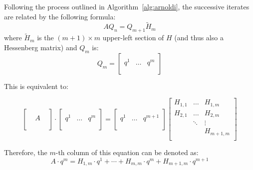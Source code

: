 \noindent Following the process outlined in Algorithm~\hyperref[alg:arnoldi]{\ref{alg:arnoldi}}, the successive iterates are related by the following formula:
\begin{equation}
\label{eqn:arnoldi}
AQ_n=Q_{m+1}\tilde{H}_m
\end{equation}
\noindent where $\tilde{H}_m$ is the $(m+1) \times m$ upper-left section of $H$ (and thus also a Hessenberg matrix) and $Q_m$ is:
\begin{equation}
  Q_m =
  \left[
    \begin{array}{c|c|c}
      & & \\
      q^1 &\dots & q^m \\
      & & \\
    \end{array}
  \right] 
\end{equation}

\noindent This is equivalent to:

\begin{equation}
  \left[
    \begin{array}{ccc}
      &  & \\
      & A & \\
      &  & \\
    \end{array}
  \right] \cdot
  \left[
    \begin{array}{c|c|c}
      & & \\
      q^1 &\dots & q^m \\
      & & \\
    \end{array}
  \right] = 
  \left[
    \begin{array}{c|c|c}
      & & \\
      q^1 &\dots & q^{m+1} \\
      & & \\
    \end{array}
  \right]
  \left[
    \begin{array}{ccc}
      H_{1,1} & \dots & H_{1,m} \\
      H_{2,1} & \dots &  H_{2,m}\\
      & \ddots & \vdots \\
      & & H_{m+1, m}  \\
    \end{array}
  \right] 
\end{equation}

\noindent Therefore, the $m$-th column of this equation can be denoted as:
\begin{equation}
    A \cdot q^m = H_{1,m}\cdot q^1+ \cdots + H_{m,m}\cdot q^m + H_{m+1,m}\cdot q^{m+1}
\end{equation}

